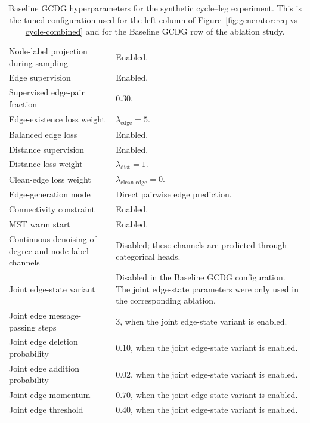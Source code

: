 \begin{table}[p]
\begin{tabularx}{\textwidth}{@{}p{}X@{}}
Node-label projection during sampling & Enabled. \\
Edge supervision & Enabled. \\
Supervised edge-pair fraction & \(0.30\). \\
Edge-existence loss weight & \(\lambda_{\mathrm{edge}}=5\). \\
Balanced edge loss & Enabled. \\
Distance supervision & Enabled. \\
Distance loss weight & \(\lambda_{\mathrm{dist}}=1\). \\
Clean-edge loss weight & \(\lambda_{\mathrm{clean\text{-}edge}}=0\). \\
Edge-generation mode & Direct pairwise edge prediction. \\
Connectivity constraint & Enabled. \\
MST warm start & Enabled. \\
Continuous denoising of degree and node-label channels & Disabled; these channels are predicted through categorical heads. \\
Joint edge-state variant & Disabled in the Baseline GCDG configuration. The joint edge-state parameters were only used in the corresponding ablation. \\
Joint edge message-passing steps & \(3\), when the joint edge-state variant is enabled. \\
Joint edge deletion probability & \(0.10\), when the joint edge-state variant is enabled. \\
Joint edge addition probability & \(0.02\), when the joint edge-state variant is enabled. \\
Joint edge momentum & \(0.70\), when the joint edge-state variant is enabled. \\
Joint edge threshold & \(0.40\), when the joint edge-state variant is enabled. \\
\bottomrule
\end{tabularx}
\caption{Baseline GCDG hyperparameters for the synthetic cycle--leg experiment. This is the tuned configuration used for the left column of Figure~\ref{fig:generator:req-vs-cycle-combined} and for the Baseline GCDG row of the ablation study.}
\label{tab:synthetic-cycle-leg-proposed-hyperparameters}
\end{table}

